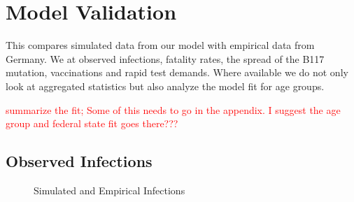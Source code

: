 \section{Model Validation}
\label{sec:model_validation}

This compares simulated data from our model with empirical data from Germany. We at
observed infections, fatality rates, the spread of the B117 mutation, vaccinations and
rapid test demands. Where available we do not only look at aggregated statistics but
also analyze the model fit for age groups.

\textcolor{red}{summarize the fit; Some of this needs to go in the appendix. I suggest the age group and federal state fit goes there???}


\subsection{Observed Infections}
\label{sub:in_sample_fit}




\begin{figure}[ht]
\centering
\caption{Simulated and Empirical Infections}
\label{fig:aggregated_fit2}
\end{figure}



